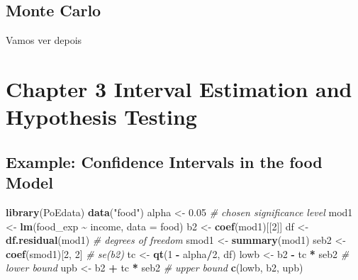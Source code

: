 \documentclass[
]{book}
\newenvironment{Shaded}{\begin{snugshade}}{\end{snugshade}}
\newcommand{\AttributeTok}[1]{\textcolor[rgb]{0.13,0.29,0.53}{#1}}
\newcommand{\CommentTok}[1]{\textcolor[rgb]{0.56,0.35,0.01}{\textit{#1}}}
\newcommand{\DecValTok}[1]{\textcolor[rgb]{0.00,0.00,0.81}{#1}}
\newcommand{\FloatTok}[1]{\textcolor[rgb]{0.00,0.00,0.81}{#1}}
\newcommand{\FunctionTok}[1]{\textcolor[rgb]{0.13,0.29,0.53}{\textbf{#1}}}
\newcommand{\NormalTok}[1]{#1}
\newcommand{\OtherTok}[1]{\textcolor[rgb]{0.56,0.35,0.01}{#1}}
\newcommand{\SpecialCharTok}[1]{\textcolor[rgb]{0.81,0.36,0.00}{\textbf{#1}}}
\newcommand{\StringTok}[1]{\textcolor[rgb]{0.31,0.60,0.02}{#1}}
\begin{document}
\hypertarget{monte-carlo}{%
\section{Monte Carlo}\label{monte-carlo}}

Vamos ver depois

\hypertarget{chapter-3-interval-estimation-and-hypothesis-testing}{%
\chapter{Chapter 3 Interval Estimation and Hypothesis
Testing}\label{chapter-3-interval-estimation-and-hypothesis-testing}}

\hypertarget{example-confidence-intervals-in-the-food-model}{%
\section{Example: Confidence Intervals in the food
Model}\label{example-confidence-intervals-in-the-food-model}}

\begin{Shaded}
\begin{Highlighting}[]
\FunctionTok{library}\NormalTok{(PoEdata)}
\FunctionTok{data}\NormalTok{(}\StringTok{"food"}\NormalTok{)}
\NormalTok{alpha }\OtherTok{\textless{}{-}} \FloatTok{0.05}  \CommentTok{\# chosen significance level}
\NormalTok{mod1 }\OtherTok{\textless{}{-}} \FunctionTok{lm}\NormalTok{(food\_exp }\SpecialCharTok{\textasciitilde{}}\NormalTok{ income, }\AttributeTok{data =}\NormalTok{ food)}
\NormalTok{b2 }\OtherTok{\textless{}{-}} \FunctionTok{coef}\NormalTok{(mod1)[[}\DecValTok{2}\NormalTok{]]}
\NormalTok{df }\OtherTok{\textless{}{-}} \FunctionTok{df.residual}\NormalTok{(mod1)  }\CommentTok{\# degrees of freedom}
\NormalTok{smod1 }\OtherTok{\textless{}{-}} \FunctionTok{summary}\NormalTok{(mod1)}
\NormalTok{seb2 }\OtherTok{\textless{}{-}} \FunctionTok{coef}\NormalTok{(smod1)[}\DecValTok{2}\NormalTok{, }\DecValTok{2}\NormalTok{]  }\CommentTok{\# se(b2)}
\NormalTok{tc }\OtherTok{\textless{}{-}} \FunctionTok{qt}\NormalTok{(}\DecValTok{1} \SpecialCharTok{{-}}\NormalTok{ alpha}\SpecialCharTok{/}\DecValTok{2}\NormalTok{, df)}
\NormalTok{lowb }\OtherTok{\textless{}{-}}\NormalTok{ b2 }\SpecialCharTok{{-}}\NormalTok{ tc }\SpecialCharTok{*}\NormalTok{ seb2  }\CommentTok{\# lower bound}
\NormalTok{upb }\OtherTok{\textless{}{-}}\NormalTok{ b2 }\SpecialCharTok{+}\NormalTok{ tc }\SpecialCharTok{*}\NormalTok{ seb2  }\CommentTok{\# upper bound}
\FunctionTok{c}\NormalTok{(lowb, b2, upb)}
\end{Highlighting}
\end{Shaded}
\end{document}
